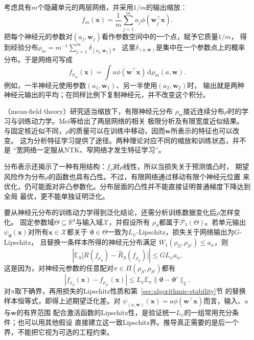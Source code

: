 考虑具有$m$个隐藏单元的两层网络，并采用$1/m$的输出缩放：
\[
 f_m(\bm x)=\frac1m\sum_{j=1}^m a_j\phi(\bm w_j^\top\bm x).
\]
把每个神经元的参数对$(a_j,\bm w_j)$看作参数空间中的一个点，赋予它质量$1/m$，
得到经验分布$\rho_m=m^{-1}\sum_{j=1}^m\delta_{(a_j,\bm w_j)}$。
这里$\delta_{(a,\bm w)}$是集中在一个参数点上的概率分布。于是网络可写成
\begin{equation}
 f_{\rho_m}(\bm x)=\int a\phi(\bm w^\top\bm x)\,\mathrm d\rho_m(a,\bm w).
 \label{eq:mean-field-network}
\end{equation}
例如，一半神经元使用参数$(a_1,\bm w_1)$、另一半使用$(a_2,\bm w_2)$时，
输出就是两种神经元输出的平均；在同样比例下复制神经元，并不改变这个积分。

（mean-field theory）研究适当缩放下，有限神经元分布
$\rho_m$接近连续分布$\rho$时的学习与训练动力学。Mei等给出了两层网络的相关
极限分析及有限宽度近似结果。
与固定核近似不同，$\rho$的质量可以在训练中移动，因而$\bm w$所表示的特征也可以改变。
这为分析特征学习提供了途径。两种理论对应不同的缩放和训练状态，并不是
“宽网络一定服从NTK、窄网络才发生特征学习”。

分布表示还揭示了一种有用结构：$f_\rho$对$\rho$线性，所以当损失关于预测值凸时，
期望风险作为分布$\rho$的函数也具有凸性。不过，有限网络通过移动有限个神经元位置
来优化，仍可能面对非凸参数化。分布层面的凸性并不能直接证明普通梯度下降达到全局
最优，更不能单独证明泛化。

要从神经元分布的训练动力学得到泛化结论，还需分析训练数据变化后$\rho$怎样变化。
固定参数域$\Theta\subseteq\mathbb R^q$与输入域$\mathcal X$，并假设所有
$\rho_S$都属于$\mathcal P_1(\Theta)$。若单元输出
$\psi_{\bm\vartheta}(\bm x)$对所有$\bm x\in\mathcal X$都关于
$\bm\vartheta\in\Theta$一致为$L_\psi$-Lipschitz，损失关于网络输出为$G$-Lipschitz，
且替换一条样本所得的神经元分布满足
$W_1(\rho_S,\rho_{S'})\leq a_n$，则
\[
 \left|\mathbb E_S\bigl[R(f_{\rho_S})-\hat R_S(f_{\rho_S})\bigr]\right|
 \leq G L_\psi a_n.
\]
这是因为，对神经元参数的任意配对$\pi\in\Pi(\rho_S,\rho_{S'})$都有
\[
 |f_{\rho_S}(\bm x)-f_{\rho_{S'}}(\bm x)|
 \leq L_\psi\mathbb E_\pi
       \|\bm\vartheta-\bm\vartheta'\|_2.
\]
对$\pi$取下确界，再用损失的Lipschitz性质和第~\ref{sec:algorithmic-stability}节
的替换样本恒等式，即得上述期望泛化差。对
$\psi_{(a,\bm w)}(\bm x)=a\phi(\bm w^\top\bm x)$而言，输入、$a$与$\bm w$的有界范围
配合激活函数的Lipschitz性，是验证统一$L_\psi$的一组常用充分条件；也可以用其他假设
直接建立这一致Lipschitz界。推导真正需要的是后一个界，不能把它视为可选的工程约束。

